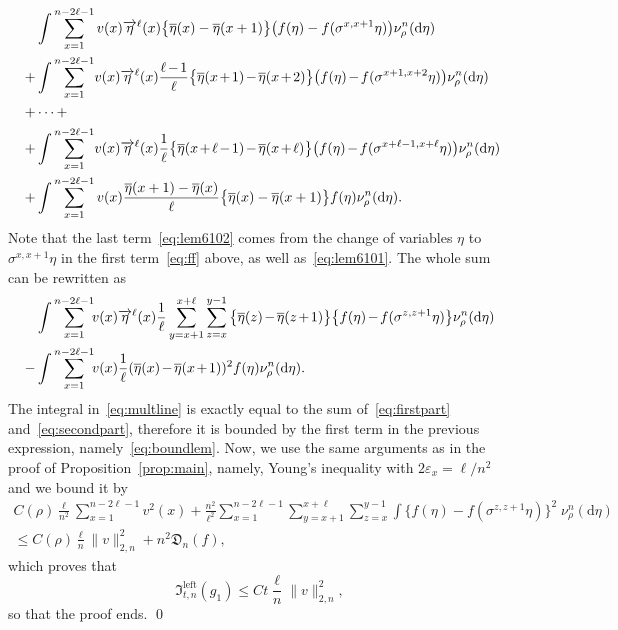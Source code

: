 \documentclass[10pt]{amsart}
\theoremstyle{definition}\newtheorem{defi}[theo]{Definition}\newtheorem{rema}[theo]{Remark}\newtheorem{exam}[theo]{Example}\newtheorem{exem}[theo]{Example}\newtheorem{nota}[theo]{Notation}
\newcommand*{\rmleft}{\mathrm{left}}
\newcommand{\mf}[1]{{\mathfrak #1}}
\renewcommand\vec[1]{\overrightarrow{#1}}
\renewcommand{\bar}{\overline}
\renewcommand{\leq}{\leqslant}
\newcommand*{\dd}{\mathrm{d}}
\newcommand*{\Mk}{\mkern -2mu}
\begin{document}
\begin{align}
&\int \sum_{x=1}^{n-2\ell-1}v(x)\vec{\eta}^\ell(x)\big\{\bar{\eta}(x)-\bar{\eta}(x+1)\big\}\big(f(\eta)-f(\sigma^{x,x+1}\eta)\big)\nu^n_\rho(\dd\eta) \label{eq:lem6101}
\\
+&\int \sum_{x=1}^{n-2\ell-1}\!v(x)\vec{\eta}^\ell(x)\frac{\ell\Mk-\Mk 1}{\ell}\big\{\bar{\eta}(x\Mk+\Mk 1)\Mk-\Mk\bar{\eta}(x\Mk+\Mk 2)\big\}\big(f(\eta)\Mk-\Mk f(\sigma^{x+1,x+2}\eta)\big)\nu^n_\rho(\dd\eta) \notag\\
+&\cdots+ \notag \\
+& \int \sum_{x=1}^{n-2\ell-1}\! v(x)\vec{\eta}^\ell(x)\frac{1}{\ell}\big\{\bar{\eta}(x\Mk+\Mk\ell\Mk-\Mk 1)\Mk-\Mk\bar{\eta}(x\Mk+\Mk\ell)\big\}\big(f(\eta)\Mk-\Mk f(\sigma^{x+\ell-1,x+\ell}\eta)\big)\nu^n_\rho(\dd\eta)\notag\!\!\\
\!\!+&\int\sum_{x=1}^{n-2\ell-1}v(x)\frac{\bar{\eta}(x+1)-\bar{\eta}(x)}{\ell}\big\{\bar{\eta}(x)-\bar{\eta}(x+1)\big\}f(\eta)\nu^n_\rho(\dd\eta). \label{eq:lem6102}
\end{align}
Note that the last term~\eqref{eq:lem6102} comes from the change of variables $\eta$ to $\sigma^{x,x+1}\eta$ in the first term~\eqref{eq:ff} above, as well as~\eqref{eq:lem6101}. The whole sum can be rewritten as
\begin{align}
&\int \sum_{x=1}^{n-2\ell-1}\!\!v(x)\vec{\eta}^\ell(x)\frac{1}{\ell}\sum_{y=x+1}^{x+\ell}\sum_{z=x}^{y-1}\big\{\bar{\eta}(z)\Mk-\Mk\bar{\eta}(z\Mk+\Mk 1)\big\}\big\{f(\eta)\Mk-\Mk f(\sigma^{z,z+1}\eta)\big\}\nu^n_\rho(\dd\eta)\label{eq:boundlem}
\\
-&\int\sum_{x=1}^{n-2\ell-1}\!\!v(x)\frac{1}{\ell}(\bar{\eta}(x)\Mk-\Mk\bar{\eta}(x\Mk+\Mk 1))^2f(\eta)\nu^n_\rho(\dd\eta).\label{eq:secondpart}
\end{align}
The integral in~\eqref{eq:multline} is exactly equal to the sum of~\eqref{eq:firstpart} and~\eqref{eq:secondpart}, therefore it is bounded by the first term in the previous expression, namely~\eqref{eq:boundlem}. Now, we use the same arguments as in the proof of Proposition~\ref{prop:main}, namely, Young's inequality with $2\varepsilon_x=\ell/n^2 $ and we bound it by
\begin{multline*}
C(\rho)\frac{\ell}{ n^2} \sum_{x=1}^{n-2\ell-1}v^2(x)+\frac{n^2}{{\ell^2}} \sum_{x=1}^{n-2\ell-1}\sum_{y=x+1}^{x+\ell}\sum_{z=x}^{y-1}\int \big\{f(\eta)-f(\sigma^{z,z+1}\eta)\big\}^2\; \nu^n_\rho(\dd\eta)\\
\leq C(\rho) \frac{\ell}{n} \|v\|_{2,n}^2 + n^2 \mathfrak D_n(f),
\end{multline*}
which proves that
\[
\mf I_{t,n}^{\rmleft}(g_1) \leq Ct\frac{\ell}{n} \|v\|_{2,n}^2,
\]
so that the proof ends. \qed
\end{document}
